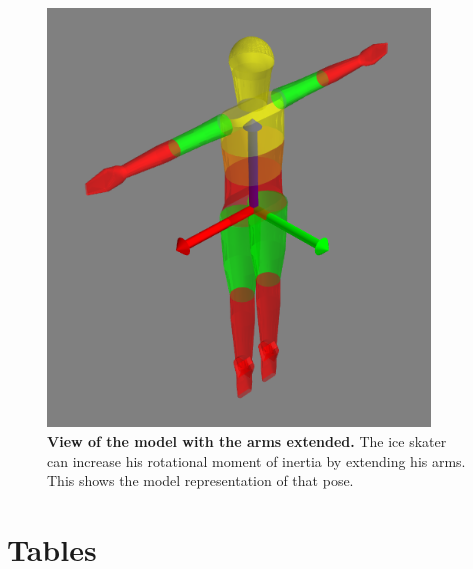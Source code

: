\documentclass[10pt]{article}
\begin{document}
\begin{figure}[!ht]
  \begin{center}
    \includegraphics[width=4in]{figfactory/iceskater.png}
  \end{center}
  \caption{
    {\bf View of the model with the arms extended.} The ice skater can increase
    his rotational moment of inertia by extending his arms.
    This shows the model representation of that pose.
  }
  \label{fig:iceskater}
\end{figure}

\section*{Tables}
\end{document}
